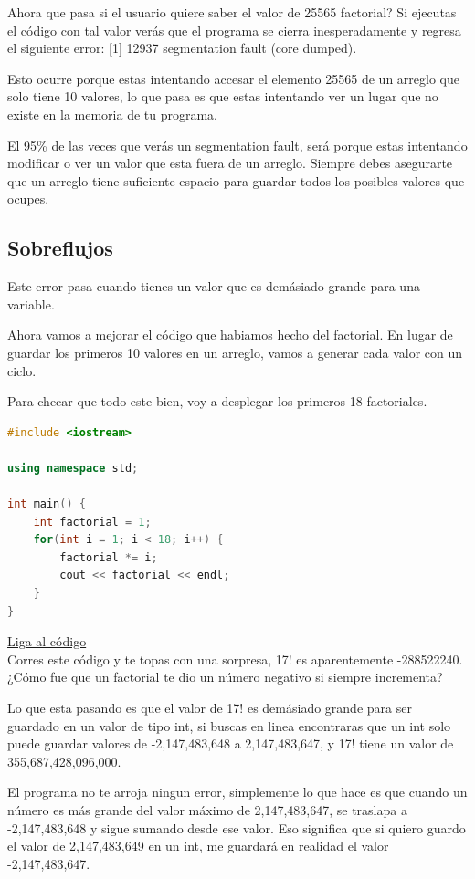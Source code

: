 \documentclass{article}
\begin{document}
Ahora que pasa si el usuario quiere saber el valor de 25565 factorial? Si ejecutas el código con tal valor verás que el programa se cierra inesperadamente y regresa el siguiente error: [1] 12937 segmentation fault (core dumped).

Esto ocurre porque estas intentando accesar el elemento 25565 de un arreglo que solo tiene 10 valores, lo que pasa es que estas intentando ver un lugar que no existe en la memoria de tu programa.

El 95\% de las veces que verás un segmentation fault, será porque estas intentando modificar o ver un valor que esta fuera de un arreglo. Siempre debes asegurarte que un arreglo tiene suficiente espacio para guardar todos los posibles valores que ocupes.

\subsection{Sobreflujos}
Este error pasa cuando tienes un valor que es demásiado grande para una variable.

Ahora vamos a mejorar el código que habiamos hecho del factorial. En lugar de guardar los primeros 10 valores en un arreglo, vamos a generar cada valor con un ciclo.

Para checar que todo este bien, voy a desplegar los primeros 18 factoriales.

\begin{lstlisting}[language=C++, caption=Sobreflujo]
#include <iostream>

using namespace std;

int main() {
    int factorial = 1;
    for(int i = 1; i < 18; i++) {
        factorial *= i;
        cout << factorial << endl;
    }
}
\end{lstlisting}
\href{https://repl.it/@Jamesscn/Sobrefactorial}{Liga al código}\\

Corres este código y te topas con una sorpresa, 17! es aparentemente -288522240. ¿Cómo fue que un factorial te dio un número negativo si siempre incrementa?

Lo que esta pasando es que el valor de 17! es demásiado grande para ser guardado en un valor de tipo int, si buscas en linea encontraras que un int solo puede guardar valores de -2,147,483,648 a 2,147,483,647, y 17! tiene un valor de 355,687,428,096,000.

El programa no te arroja ningun error, simplemente lo que hace es que cuando un número es más grande del valor máximo de 2,147,483,647, se traslapa a -2,147,483,648 y sigue sumando desde ese valor. Eso significa que si quiero guardo el valor de 2,147,483,649 en un int, me guardará en realidad el valor -2,147,483,647.
\end{document}
